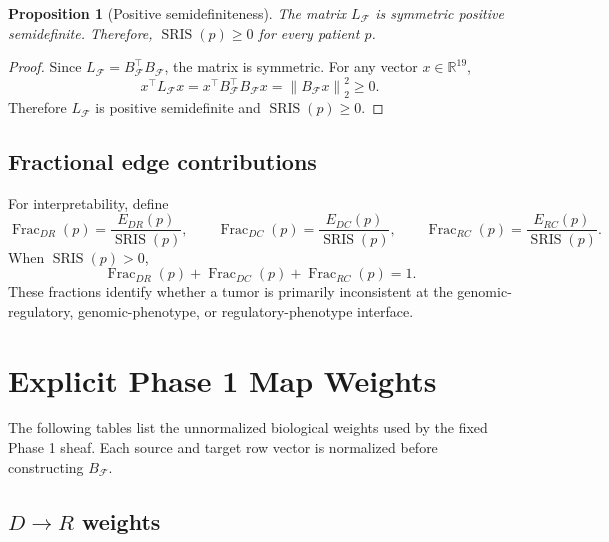 \documentclass[11pt]{article}
\newtheorem{proposition}{Proposition}[section]
\newcommand{\R}{\mathbb{R}}
\newcommand{\BF}{B_{\mathcal{F}}}
\newcommand{\LF}{L_{\mathcal{F}}}
\newcommand{\SRIS}{\operatorname{SRIS}}
\newcommand{\norm}[1]{\left\lVert #1 \right\rVert}
\begin{document}
\begin{proposition}[Positive semidefiniteness]
The matrix $\LF$ is symmetric positive semidefinite.  Therefore, $\SRIS(p)\ge 0$ for every patient $p$.
\end{proposition}

\begin{proof}
Since $\LF=\BF^\top\BF$, the matrix is symmetric.  For any vector $x\in\R^{19}$,
\[
x^\top\LF x=x^\top \BF^\top\BF x=\norm{\BF x}_2^2\ge 0.
\]
Therefore $\LF$ is positive semidefinite and $\SRIS(p)\ge 0$.
\end{proof}

\subsection{Fractional edge contributions}

For interpretability, define
\[
\operatorname{Frac}_{DR}(p)=\frac{E_{DR}(p)}{\SRIS(p)},
\qquad
\operatorname{Frac}_{DC}(p)=\frac{E_{DC}(p)}{\SRIS(p)},
\qquad
\operatorname{Frac}_{RC}(p)=\frac{E_{RC}(p)}{\SRIS(p)}.
\]
When $\SRIS(p)>0$,
\[
\operatorname{Frac}_{DR}(p)+\operatorname{Frac}_{DC}(p)+\operatorname{Frac}_{RC}(p)=1.
\]
These fractions identify whether a tumor is primarily inconsistent at the genomic-regulatory, genomic-phenotype, or regulatory-phenotype interface.

\section{Explicit Phase 1 Map Weights}

The following tables list the unnormalized biological weights used by the fixed Phase 1 sheaf.  Each source and target row vector is normalized before constructing $\BF$.

\subsection{$D\to R$ weights}
\end{document}
